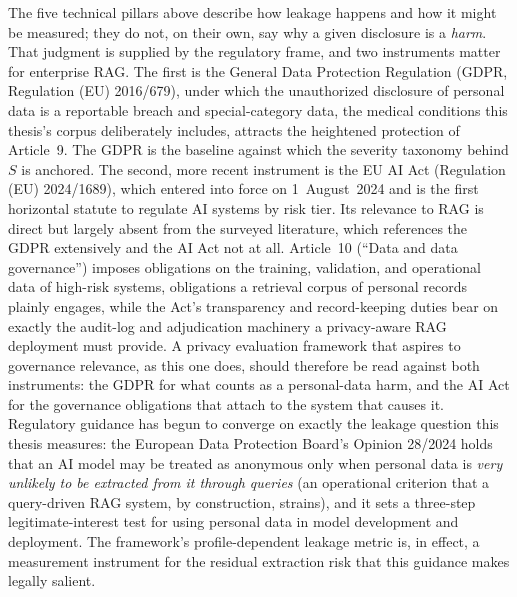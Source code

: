 \documentclass[12pt,a4paper]{report}
\begin{document}
The five technical pillars above describe how leakage happens and how it might be measured; they do
not, on their own, say why a given disclosure is a \emph{harm}. That judgment is supplied by the
regulatory frame, and two instruments matter for enterprise RAG. The first is the General Data
Protection Regulation (GDPR, Regulation (EU) 2016/679), under which the unauthorized disclosure of
personal data is a reportable breach and special-category data, the medical conditions this
thesis's corpus deliberately includes, attracts the heightened protection of Article~9. The GDPR
is the baseline against which the severity taxonomy behind $S$ is anchored. The second, more recent
instrument is the EU AI Act (Regulation (EU) 2024/1689), which entered into force on 1~August~2024
and is the first horizontal statute to regulate AI systems by risk tier. Its relevance to RAG is
direct but largely absent from the surveyed literature, which references the GDPR extensively and the
AI Act not at all. Article~10 (``Data and data governance'') imposes obligations on the training,
validation, and operational data of high-risk systems, obligations a retrieval corpus of personal
records plainly engages, while the Act's transparency and record-keeping duties bear on exactly
the audit-log and adjudication machinery a privacy-aware RAG deployment must provide. A privacy
evaluation framework that aspires to governance relevance, as this one does, should therefore be read
against both instruments: the GDPR for what counts as a personal-data harm, and the AI Act for the
governance obligations that attach to the system that causes it. Regulatory guidance has
begun to converge on exactly the leakage question this thesis measures: the European Data Protection
Board's Opinion 28/2024 holds that an AI model may be treated as anonymous only when personal data is
\emph{very unlikely to be extracted from it through queries} (an operational criterion that a
query-driven RAG system, by construction, strains), and it sets a three-step legitimate-interest
test for using personal data in model development and deployment. The framework's profile-dependent
leakage metric is, in effect, a measurement instrument for the residual extraction risk that this
guidance makes legally salient.
\end{document}
